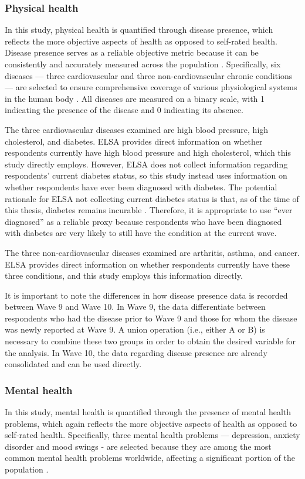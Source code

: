 \subsubsection{Physical health}
In this study, physical health is quantified through disease presence, which reflects the more objective aspects of health as opposed to self-rated health. Disease presence serves as a reliable objective metric because it can be consistently and accurately measured across the population \parencite{thacker_measuring_2006}. Specifically, six diseases — three cardiovascular and three non-cardiovascular chronic conditions — are selected to ensure comprehensive coverage of various physiological systems in the human body \parencite{seplaki_measurement_2006}. All diseases are measured on a binary scale, with 1 indicating the presence of the disease and 0 indicating its absence.

The three cardiovascular diseases examined are high blood pressure, high cholesterol, and diabetes. ELSA provides direct information on whether respondents currently have high blood pressure and high cholesterol, which this study directly employs. However, ELSA does not collect information regarding respondents' current diabetes status, so this study instead uses information on whether respondents have ever been diagnosed with diabetes. The potential rationale for ELSA not collecting current diabetes status is that, as of the time of this thesis, diabetes remains incurable \parencite{diabetesuk_there_2024}. Therefore, it is appropriate to use ``ever diagnosed” as a reliable proxy because respondents who have been diagnosed with diabetes are very likely to still have the condition at the current wave.

The three non-cardiovascular diseases examined are arthritis, asthma, and cancer. ELSA provides direct information on whether respondents currently have these three conditions, and this study employs this information directly.

It is important to note the differences in how disease presence data is recorded between Wave 9 and Wave 10. In Wave 9, the data differentiate between respondents who had the disease prior to Wave 9 and those for whom the disease was newly reported at Wave 9. A union operation (i.e., either A or B) is necessary to combine these two groups in order to obtain the desired variable for the analysis. In Wave 10, the data regarding disease presence are already consolidated and can be used directly.

\subsubsection{Mental health}
In this study, mental health is quantified through the presence of mental health problems, which again reflects the more objective aspects of health as opposed to self-rated health. Specifically, three mental health problems — depression, anxiety disorder and mood swings - are selected because they are among the most common mental health problems worldwide, affecting a significant portion of the population \parencite{worldhealthorganization_depressive_2023}. 

